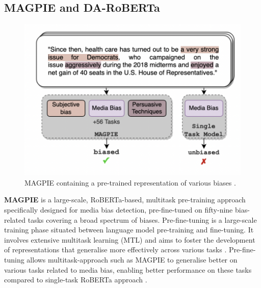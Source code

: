 

\subsection{MAGPIE and DA-RoBERTa}

\begin{figure}[htbp]
    \centering
    \includegraphics[width=0.7\linewidth]{images/magpie.png}
    \caption{MAGPIE containing a pre-trained representation of various biases \cite{horych-2024-magpie}.}
    \label{fig:magpie}
\end{figure}

\textbf{MAGPIE} \cite{horych-2024-magpie} is a large-scale, RoBERTa-based, multitask pre-training approach specifically designed for media bias detection, pre-fine-tuned on fifty-nine bias-related tasks covering a broad spectrum of biases. Pre-fine-tuning is a large-scale training phase situated between language model pre-training and fine-tuning. It involves extensive multitask learning (MTL) \cite{caruana-1997-mtl} and aims to foster the development of representations that generalise more effectively across various tasks \cite{aghajanyan-2021-muppet}. Pre-fine-tuning allows multitask-approach such as MAGPIE to generalise better on various tasks related to media bias, enabling better performance on these tasks compared to single-task RoBERTa approach \cite{horych-2024-magpie}.

